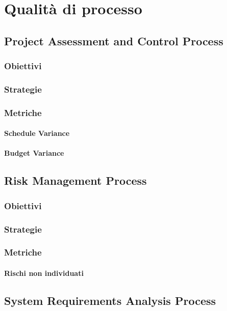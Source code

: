 \section{Qualità di processo}
	\subsection{Project Assessment and Control Process}
		\subsubsection{Obiettivi}
		\subsubsection{Strategie}
		\subsubsection{Metriche}
			\paragraph{Schedule Variance}
			\paragraph{Budget Variance}
	
	\subsection{Risk Management Process}
		\subsubsection{Obiettivi}
		\subsubsection{Strategie}
		\subsubsection{Metriche}
			\paragraph{Rischi non individuati}
	
	\subsection{System Requirements Analysis Process}
